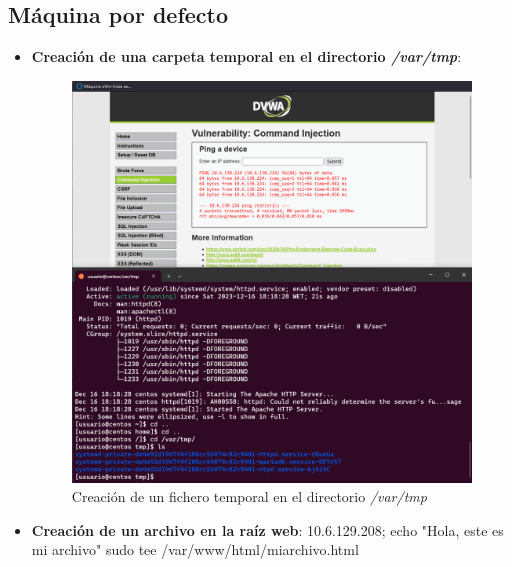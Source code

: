 \documentclass[11pt]{report}
\begin{document}
\subsection{Máquina por defecto}
\begin{itemize}
  \item \textbf{Creación de una carpeta temporal en el directorio \emph{/var/tmp}}:
        \begin{figure}[H]
          \centering
          \includegraphics[scale=0.35]{img/CentOS/Centos7_Base_1.png}
          \caption{Creación de un fichero temporal en el directorio \emph{/var/tmp}}
        \end{figure}
  \item \textbf{Creación de un archivo en la raíz web}: 10.6.129.208; echo "Hola, este es mi archivo" \textbar \space sudo tee /var/www/html/miarchivo.html
        \begin{figure}[H]
          \centering

\end{figure}
\end{itemize}
\end{document}

